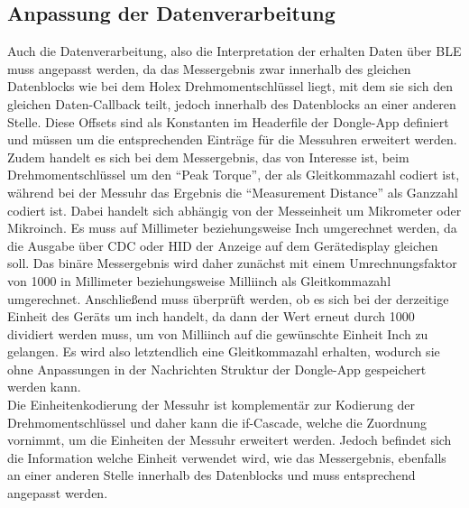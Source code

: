 \subsection{Anpassung der Datenverarbeitung}
Auch die Datenverarbeitung, also die Interpretation der erhalten Daten über BLE muss angepasst werden, da das Messergebnis zwar innerhalb des gleichen Datenblocks wie bei dem Holex Drehmomentschlüssel liegt, mit dem sie sich den gleichen Daten-Callback teilt, jedoch innerhalb des Datenblocks an einer anderen Stelle. Diese Offsets sind als Konstanten im Headerfile der Dongle-App definiert und müssen um die entsprechenden Einträge für die Messuhren erweitert werden. Zudem handelt es sich bei dem Messergebnis, das von Interesse ist, beim Drehmomentschlüssel um den ``Peak Torque'', der als Gleitkommazahl codiert ist, während bei der Messuhr das Ergebnis die ``Measurement Distance'' als Ganzzahl codiert ist. Dabei handelt sich abhängig von der Messeinheit um Mikrometer oder Mikroinch. Es muss auf Millimeter beziehungsweise Inch umgerechnet werden, da die Ausgabe über CDC oder HID der Anzeige auf dem Gerätedisplay gleichen soll. Das binäre Messergebnis wird daher zunächst mit einem Umrechnungsfaktor von 1000 in Millimeter beziehungsweise Milliinch als Gleitkommazahl umgerechnet. Anschließend muss überprüft werden, ob es sich bei der derzeitige Einheit des Geräts um inch handelt, da dann der Wert erneut durch 1000 dividiert werden muss, um von Milliinch auf die gewünschte Einheit Inch zu gelangen. Es wird also letztendlich eine Gleitkommazahl erhalten, wodurch sie ohne Anpassungen in der Nachrichten Struktur der Dongle-App gespeichert werden kann.\\
Die Einheitenkodierung der Messuhr ist komplementär zur Kodierung der Drehmomentschlüssel und daher kann die if-Cascade, welche die Zuordnung vornimmt, um die Einheiten der Messuhr erweitert werden. Jedoch befindet sich die Information welche Einheit verwendet wird, wie das Messergebnis, ebenfalls an einer anderen Stelle innerhalb des Datenblocks und muss entsprechend angepasst werden.

